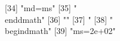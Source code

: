  [34] "{md}={ms}"                                                                                                                                                                                                                                                                                                                                                                                                                                                                                   
 [35] "\\end{dmath}"                                                                                                                                                                                                                                                                                                                                                                                                                                                                                
 [36] ""                                                                                                                                                                                                                                                                                                                                                                                                                                                                                            
 [37] "%
 [38] "\\begin{dmath}"                                                                                                                                                                                                                                                                                                                                                                                                                                                                              
 [39] "{ms}=2e+02"                                                                                                                                                                                                                                                                                                                                                                                                                                                                                  
